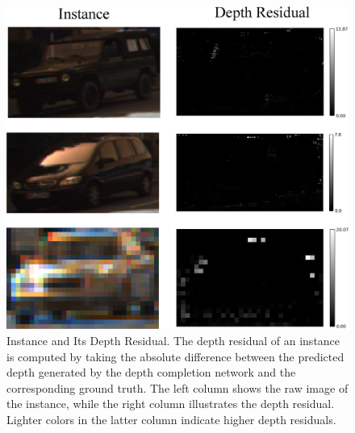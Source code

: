\documentclass[journal]{IEEEtran}
\begin{document}
	\begin{figure}[!t]
		\centering
		\includegraphics[width=1.0\linewidth]{Figures/depth_residual}
		\caption{Instance and Its Depth Residual. The depth residual of an instance is computed by taking the absolute difference between the predicted depth generated by the depth completion network and the corresponding ground truth. The left column shows the raw image of the instance, while the right column illustrates the depth residual. Lighter colors in the latter column indicate higher depth residuals.}
		\label{fig:depth_residual}
	\end{figure}
\end{document}

